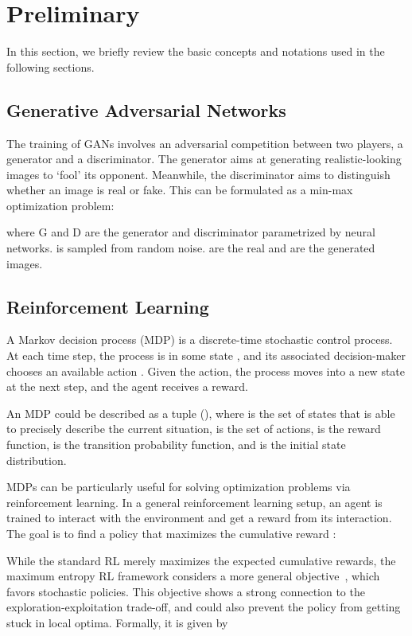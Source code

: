 \documentclass[runningheads]{llncs}
\begin{document}
\section{Preliminary}
In this section, we briefly review the basic concepts and notations used in the following sections.


\subsection{Generative Adversarial Networks}
The training of GANs involves an adversarial competition between two players, a generator and a discriminator. The generator aims at generating realistic-looking images to `fool' its opponent. Meanwhile, the discriminator aims to distinguish whether an image is real or fake. This can be formulated as a min-max optimization problem:


where G and D are the generator and discriminator parametrized by neural networks.  is sampled from random noise.  are the real and   are the generated images. 

\subsection{Reinforcement Learning}
A Markov decision process (MDP) is a discrete-time stochastic control process. At each time step, the process is in some state , and its associated decision-maker chooses an available action . Given the action, the process moves into a new state  at the next step, and the agent receives a reward. 

An MDP could be described as a tuple 
(), where  is the set of states that is able to precisely describe the current situation,
 is the set of actions,  is the reward function, 
 is the 
transition probability function, and 
 is the initial state 
distribution.

MDPs can be particularly useful for solving optimization problems via reinforcement learning. In a general reinforcement learning setup, an agent is trained to interact with the environment and get a reward from its interaction. The goal is to find a policy  that maximizes the cumulative reward :





While the standard RL merely maximizes the expected cumulative rewards, the maximum entropy RL framework  considers a more general objective~\cite{ziebart2010modeling}, which favors stochastic policies. This objective shows a strong connection to the exploration-exploitation trade-off, and could also prevent the policy from getting stuck in local optima. Formally, it is given by
\end{document}
